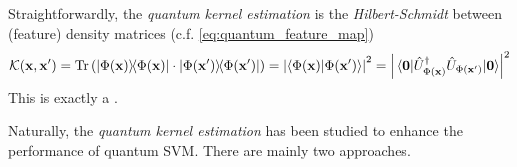 \begin{definition}\label{def:quantum_kernel}
	Straightforwardly,
	the \emph{quantum kernel estimation} is the \emph{Hilbert-Schmidt}  between (feature) density matrices (c.f. \cref{eq:quantum_feature_map})
	\begin{equation}
		\kernel(\vbx,\vbx') 
		= \Tr\qty(\dyad{\Phi(\vbx)}\cdot \dyad{\Phi(\vbx')})
		= \abs{\braket{\Phi(\vbx)}{\Phi(\vbx')}}^2 = 
		\abs{\matrixel{\vb{0}}{\U^\dagger_{\Phi(\vbx)} \U_{\Phi(\vbx')}}{\vb{0}}}^2
	\end{equation}
	This is exactly a .
\end{definition}
Naturally, the \emph{quantum kernel estimation}
\cite{schuldQuantumMachineLearning2019}
\cite{havlicekSupervisedLearningQuantum2019} 
has been studied to enhance the performance of quantum SVM.
There are mainly two approaches.


